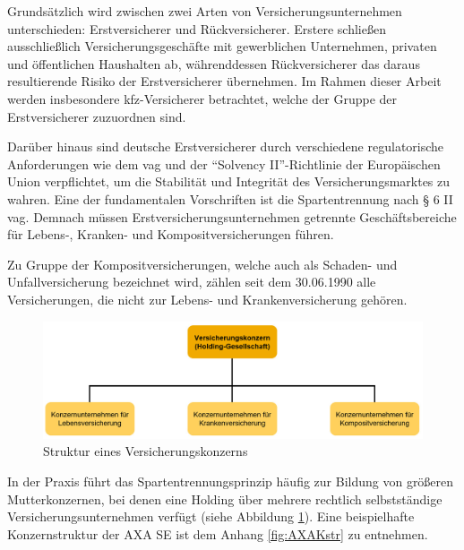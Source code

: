 Grundsätzlich wird zwischen zwei Arten von Versicherungsunternehmen unterschieden: Erstversicherer und Rückversicherer. Erstere schließen ausschließlich Versicherungsgeschäfte mit gewerblichen Unternehmen, privaten und öffentlichen Haushalten ab, währenddessen Rückversicherer das daraus resultierende Risiko der Erstversicherer übernehmen.\autocite[Vgl.][S. 240f.]{FARNY2011} Im Rahmen dieser Arbeit werden insbesondere \ac{kfz}-Versicherer betrachtet, welche der Gruppe der Erstversicherer zuzuordnen sind.

Darüber hinaus sind deutsche Erstversicherer durch verschiedene regulatorische Anforderungen wie dem \ac{vag} und der \enquote{Solvency II}-Richtlinie der Europäischen Union verpflichtet, um die Stabilität und Integrität des Versicherungsmarktes zu wahren. \autocite[Vgl.][]{BAFIN2016} Eine der fundamentalen Vorschriften ist die Spartentrennung nach § 6 II \ac{vag}. Demnach müssen Erstversicherungsunternehmen getrennte Geschäftsbereiche für Lebens-, Kranken- und Kompositversicherungen führen. 

Zu Gruppe der Kompositversicherungen, welche auch als Schaden- und Unfallversicherung bezeichnet wird, zählen seit dem 30.06.1990 alle Versicherungen, die nicht zur Lebens- und Krankenversicherung gehören. \autocite[Vgl.][S. 241-243]{FARNY2011} 


\begin{figure}[h]
    \centering
    \includegraphics[width=1\textwidth]{img/Struktur_VKonzern2.jpg}
    \caption[Struktur eines Versicherungskonzerns]{Struktur eines Versicherungskonzerns\autocite{StVKonzern}}
    \label{fig:StVKonzern}
\end{figure}


In der Praxis führt das Spartentrennungsprinzip häufig zur Bildung von größeren Mutterkonzernen, bei denen eine Holding über mehrere rechtlich selbstständige Versicherungsunternehmen verfügt (siehe Abbildung \ref{fig:StVKonzern}). Eine beispielhafte Konzernstruktur der AXA SE ist dem Anhang \ref{fig:AXAKstr} zu entnehmen. 

